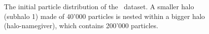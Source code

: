 \begin{frame}
	\begin{figure}[htbp!]
		\centering
		\centering
		\caption{\footnotesize
			The initial particle distribution of the \dt\ dataset. A smaller halo (subhalo 1) made of 40'000 particles is nested within a bigger halo (halo-namegiver), which contains 200'000 particles.
		}%
		\label{fig:dice_two_origin}
		\endminipage%
		\hspace*{\fill}
		\centering

\end{figure}
\end{frame}
